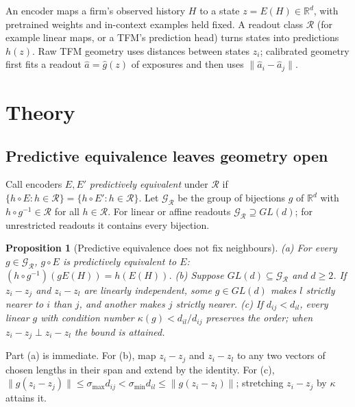 \documentclass[letterpaper]{article} %
\newtheorem{proposition}{Proposition}
\theoremstyle{definition}
\newcommand{\R}{\mathbb{R}}
\newcommand{\norm}[1]{\lVert #1\rVert}
\begin{document}
An encoder maps a firm's observed history $H$ to a state $z=E(H)\in\R^d$, with
pretrained weights and in-context examples held fixed. A readout class
$\mathcal R$ (for example linear maps, or a TFM's prediction head) turns states
into predictions $h(z)$. Raw TFM geometry uses distances between states $z_i$;
calibrated geometry first fits a readout $\hat a=\hat g(z)$ of exposures and
then uses $\norm{\hat a_i-\hat a_j}$.

\section{Theory}\label{sec:theory}
\subsection{Predictive equivalence leaves geometry open}
Call encoders $E,E'$ \emph{predictively equivalent} under $\mathcal R$ if
$\{h\circ E:h\in\mathcal R\}=\{h\circ E':h\in\mathcal R\}$. Let
$\mathcal G_{\mathcal R}$ be the group of bijections $g$ of $\R^d$ with
$h\circ g^{-1}\in\mathcal R$ for all $h\in\mathcal R$. For linear or affine
readouts $\mathcal G_{\mathcal R}\supseteq GL(d)$; for unrestricted readouts it
contains every bijection.

\begin{proposition}[Predictive equivalence does not fix
  neighbours]\label{prop:equivalence}
  (a) For every $g\in\mathcal G_{\mathcal R}$, $g\circ E$ is predictively
  equivalent to $E$: $(h\circ g^{-1})(gE(H))=h(E(H))$.
  (b) Suppose $GL(d)\subseteq\mathcal G_{\mathcal R}$ and $d\ge2$. If
  $z_i-z_j$ and $z_i-z_l$ are linearly independent, some $g\in GL(d)$ makes $l$
  strictly nearer to $i$ than $j$, and another makes $j$ strictly nearer.
  (c) If $d_{ij}<d_{il}$, every linear $g$ with condition number
  $\kappa(g)<d_{il}/d_{ij}$ preserves the order; when $z_i-z_j\perp z_i-z_l$
  the bound is attained.
\end{proposition}
\noindent Part (a) is immediate. For (b), map $z_i-z_j$ and $z_i-z_l$ to any two
vectors of chosen lengths in their span and extend by the identity. For (c),
$\norm{g(z_i-z_j)}\le\sigma_{\max}d_{ij}<\sigma_{\min}d_{il}\le
\norm{g(z_i-z_l)}$; stretching $z_i-z_j$ by $\kappa$ attains it.
\end{document}
